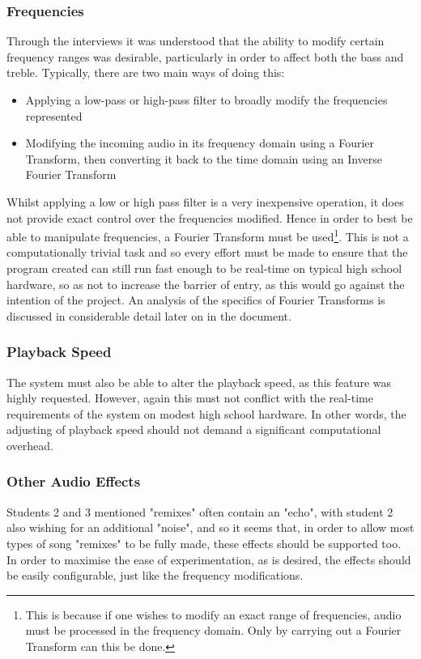\subsubsection{Frequencies}
Through the interviews it was understood that the ability to modify certain frequency ranges was desirable, particularly in order to affect both the bass and treble. Typically, there are two main ways of doing this:
\begin{itemize}
	\item Applying a low-pass or high-pass filter to broadly modify the frequencies represented
	\item Modifying the incoming audio in its frequency domain using a Fourier Transform, then converting it back to the time domain using an Inverse Fourier Transform
\end{itemize}
Whilst applying a low or high pass filter is a very inexpensive operation, it does not provide exact control over the frequencies modified. Hence in order to best be able to manipulate frequencies, a Fourier Transform must be used\footnote{This is because if one wishes to modify an exact range of frequencies, audio must be processed in the frequency domain. Only by carrying out a Fourier Transform can this be done.}.  This is not a computationally trivial task and so every effort must be made to ensure that the program created can still run fast enough to be real-time on typical high school hardware, so as not to increase the barrier of entry, as this would go against the intention of the project. An analysis of the specifics of Fourier Transforms is discussed in considerable detail later on in the document.

\subsubsection{Playback Speed}
The system must also be able to alter the playback speed, as this feature was highly requested. However, again this must not conflict with the real-time requirements of the system on modest high school hardware. In other words, the adjusting of playback speed should not demand a significant computational overhead.

\subsubsection{Other Audio Effects}
Students 2 and 3 mentioned "remixes" often contain an "echo", with student 2 also wishing for an additional "noise", and so it seems that, in order to allow most types of song "remixes" to be fully made, these effects should be supported too. In order to maximise the ease of experimentation, as is desired, the effects should be easily configurable, just like the frequency modifications.

